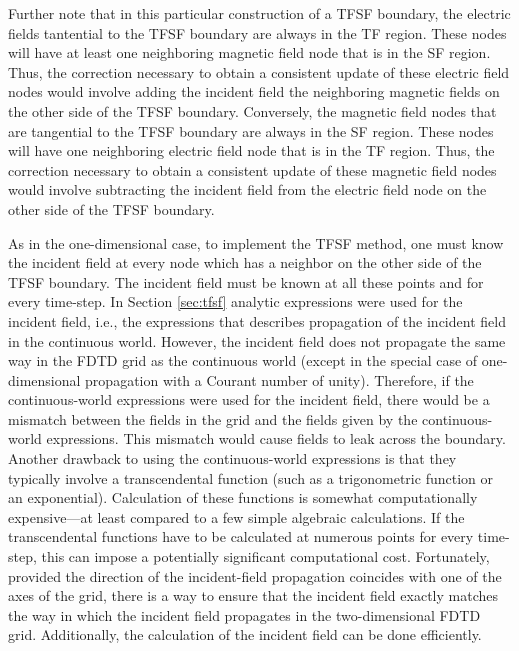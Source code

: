 Further note that in this particular construction of a TFSF boundary,
the electric fields tantential to the TFSF boundary are always in the
TF region.  These nodes will have at least one neighboring magnetic
field node that is in the SF region.  Thus, the correction necessary
to obtain a consistent update of these electric field nodes would
involve adding the incident field the neighboring magnetic fields on
the other side of the TFSF boundary.  Conversely, the magnetic field
nodes that are tangential to the TFSF boundary are always in the SF
region.  These nodes will have one neighboring electric field node
that is in the TF region.  Thus, the correction necessary to obtain a
consistent update of these magnetic field nodes would involve
subtracting the incident field from the electric field node on the
other side of the TFSF boundary.

As in the one-dimensional case, to implement the TFSF method, one must
know the incident field at every node which has a neighbor on the
other side of the TFSF boundary.  The incident field must be known at
all these points and for every time-step.  In Section \ref{sec:tfsf}
analytic expressions were used for the incident field, i.e., the
expressions that describes propagation of the incident field in the
continuous world.  However, the incident field does not propagate the
same way in the FDTD grid as the continuous world (except in the
special case of one-dimensional propagation with a Courant number of
unity).  Therefore, if the continuous-world expressions were used for
the incident field, there would be a mismatch between the fields in
the grid and the fields given by the continuous-world expressions.
This mismatch would cause fields to leak across the boundary.  Another
drawback to using the continuous-world expressions is that they
typically involve a transcendental function (such as a trigonometric
function or an exponential).  Calculation of these functions is
somewhat computationally expensive---at least compared to a few simple
algebraic calculations.  If the transcendental functions have to be
calculated at numerous points for every time-step, this can impose a
potentially significant computational cost.  Fortunately, provided the
direction of the incident-field propagation coincides with one of the
axes of the grid, there is a way to ensure that the incident field
exactly matches the way in which the incident field propagates in the
two-dimensional FDTD grid.  Additionally, the calculation of the
incident field can be done efficiently.

